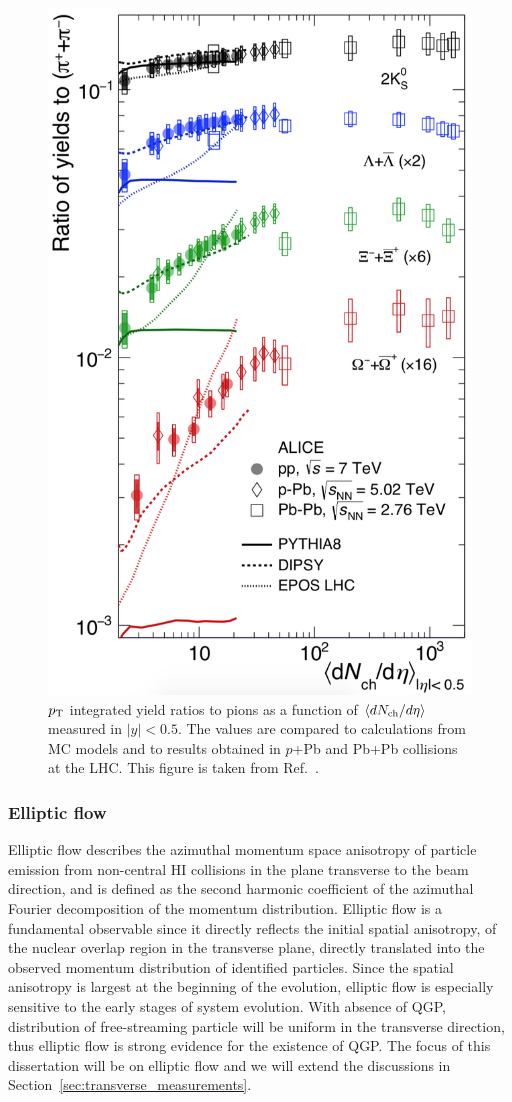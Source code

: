 \begin{figure}[H]
\centering
\includegraphics[width=.5\linewidth]{figs/chapter_intro/strangeness_ALICE.png}
\caption{$p_\text{T}$ integrated yield ratios to pions as a function of $\left\langle dN_\text{ch} / d\eta\right\rangle$ measured in $|y|<0.5$. The values are compared to calculations from MC models and to results obtained in $p$+Pb and Pb+Pb collisions at the LHC. This figure is taken from Ref.~\cite{ALICE:2017jyt}.}
\label{fig:intro_strangeness_ALICE}
\end{figure}



\subsubsection{Elliptic flow}

Elliptic flow describes the azimuthal momentum space anisotropy of particle emission from non-central HI collisions in the plane transverse to the beam direction, and is defined as the second harmonic coefficient of the azimuthal Fourier decomposition of the momentum distribution. Elliptic flow is a fundamental observable since it directly reflects the initial spatial anisotropy, of the nuclear overlap region in the transverse plane, directly translated into the observed momentum distribution of identified particles. Since the spatial anisotropy is largest at the beginning of the evolution, elliptic flow is especially sensitive to the early stages of system evolution. With absence of QGP, distribution of free-streaming particle will be uniform in the transverse direction, thus elliptic flow is strong evidence for the existence of QGP. The focus of this dissertation will be on elliptic flow and we will extend the discussions in Section~\ref{sec:transverse_measurements}.

